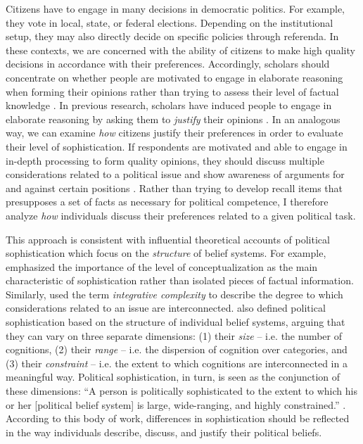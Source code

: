 Citizens have to engage in many decisions in democratic politics. For example, they vote in local, state, or federal elections. Depending on the institutional setup, they may also directly decide on specific policies through referenda. In these contexts, we are concerned with the ability of citizens to make high quality decisions in accordance with their preferences. Accordingly, scholars should concentrate on whether people are motivated to engage in elaborate reasoning when forming their opinions rather than trying to assess their level of factual knowledge \citep{druckman2014pathologies}. In previous research, scholars have induced people to engage in elaborate reasoning by asking them to \textit{justify} their opinions \citep[e.g., by providing specific reasons;][]{kunda1999motivated,redlawsk2002hot,bolsen2014influence,druckman2014pathologies}. In an analogous way, we can examine \textit{how} citizens justify their preferences in order to evaluate their level of sophistication. If respondents are motivated and able to engage in in-depth processing to form quality opinions, they should discuss multiple considerations related to a political issue and show awareness of arguments for and against certain positions \citep[c.f.,][]{cappella2002argument}. Rather than trying to develop recall items that presupposes a set of facts as necessary for political competence, I therefore analyze \textit{how} individuals discuss their preferences related to a given political task. 

This approach is consistent with influential theoretical accounts of political sophistication which focus on the \textit{structure} of belief systems. For example, \citet{converse1964nature} emphasized the importance of the level of conceptualization as the main characteristic of sophistication rather than isolated pieces of factual information. Similarly, \citet{tetlock1983cognitive} used the term \textsl{integrative complexity} to describe the degree to which considerations related to an issue are interconnected. \citet{luskin1987measuring} also defined political sophistication based on the structure of individual belief systems, arguing that they can vary on three separate dimensions: (1) their \textsl{size} -- i.e. the number of cognitions, (2) their \textsl{range} -- i.e. the dispersion of cognition over categories, and (3) their \textsl{constraint} -- i.e. the extent to which cognitions are interconnected in a meaningful way. Political sophistication, in turn, is seen as the conjunction of these dimensions: ``A person is politically sophisticated to the extent to which his or her [political belief system] is large, wide-ranging, and highly constrained.'' \citep[860]{luskin1987measuring}. According to this body of work, differences in sophistication should be reflected in the way individuals describe, discuss, and justify their political beliefs.


